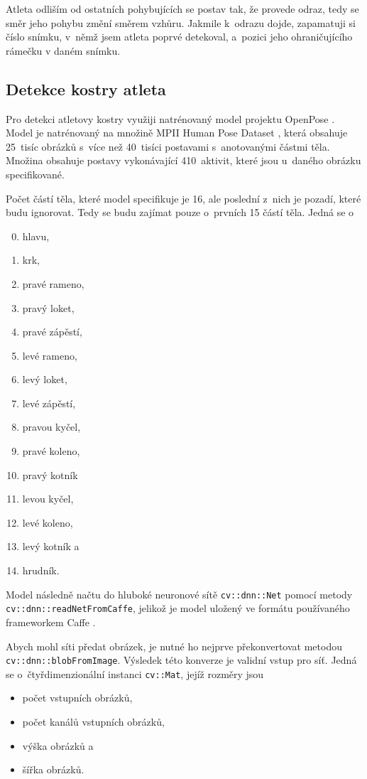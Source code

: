 Atleta odliším od ostatních pohybujících se postav tak, že provede odraz, tedy se směr jeho pohybu změní směrem vzhůru. Jakmile k~odrazu dojde, zapamatuji si číslo snímku, v~němž jsem atleta poprvé detekoval, a~pozici jeho ohraničujícího rámečku v daném snímku.

\subsection{Detekce kostry atleta}

Pro detekci atletovy kostry využiji natrénovaný model projektu OpenPose \citep{OpenPose}. Model je natrénovaný na množině MPII Human Pose Dataset \citep{MPIIHPE}, která obsahuje 25~tisíc obrázků s~více než 40~tisíci postavami s~anotovanými částmi těla. Množina obsahuje postavy vykonávající 410~aktivit, které jsou u~daného obrázku specifikované.

Počet částí těla, které model specifikuje je 16, ale poslední z~nich je pozadí, které budu ignorovat. Tedy se budu zajímat pouze o~prvních 15 částí těla. Jedná se o
\begin{enumerate}
\setcounter{enumi}{-1}
\item hlavu,
\item krk,
\item pravé rameno,
\item pravý loket,
\item pravé zápěstí,
\item levé rameno,
\item levý loket,
\item levé zápěstí,
\item pravou kyčel,
\item pravé koleno,
\item pravý kotník
\item levou kyčel,
\item levé koleno,
\item levý kotník a
\item hrudník.
\end{enumerate}

Model následně načtu do hluboké neuronové sítě \texttt{cv::dnn::Net} pomocí metody \texttt{cv::dnn::readNetFromCaffe}, jelikož je model uložený ve formátu používaného frameworkem Caffe \citep{Caffe}.

Abych mohl síti předat obrázek, je nutné ho nejprve překonvertovat metodou \texttt{cv::dnn::blobFromImage}. Výsledek této konverze je validní vstup pro síť. Jedná se o~čtyřdimenzionální instanci \texttt{cv::Mat}, jejíž rozměry jsou
\begin{itemize}
\item počet vstupních obrázků,
\item počet kanálů vstupních obrázků,
\item výška obrázků a
\item šířka obrázků.
\end{itemize}

